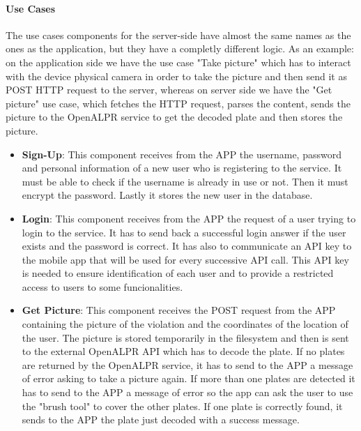 \paragraph{Use Cases}
The use cases components for the server-side have almost the same names as the ones as the application, but they have a completly different logic.
As an example: on the application side we have the use case "Take picture" which has to interact with the device physical camera in order to take the picture and then send it as POST HTTP request to the server, whereas on server side we have the "Get picture" use case, which fetches the HTTP request, parses the content, sends the picture to the OpenALPR service to get the decoded plate and then stores the picture.
\begin{itemize}
  \item \textbf{Sign-Up}: This component receives from the APP the username, password and personal information of a new user who is registering to the service. It must be able to check if the username is already in use or not. Then it must encrypt the password. Lastly it stores the new user in the database.
  \item \textbf{Login}: This component receives from the APP the request of a user trying to login to the service. It has to send back a successful login answer if the user exists and the password is correct. It has also to communicate an API key to the mobile app that will be used for every successive API call. This API key is needed to ensure identification of each user and to provide a restricted access to users to some funcionalities.
  \item \textbf{Get Picture}: This component receives the POST request from the APP containing the picture of the violation and the coordinates of the location of the user. The picture is stored temporarily in the filesystem and then is sent to the external OpenALPR API which has to decode the plate. If no plates are returned by the OpenALPR service, it has to send to the APP a message of error asking to take a picture again. If more than one plates are detected it has to send to the APP a message of error so the app can ask the user to use the "brush tool" to cover the other plates. If one plate is correctly found, it sends to the APP the plate just decoded with a success message.


\end{itemize}
